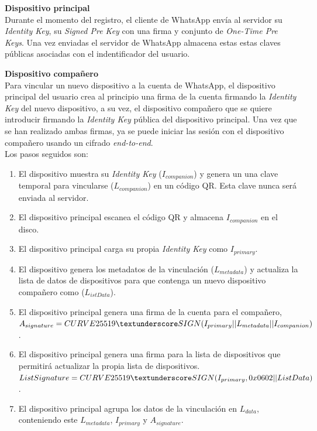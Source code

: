 \begin{description}
	\item \textbf{Dispositivo principal}\\
	Durante el momento del registro, el cliente de WhatsApp envía al servidor su \emph{Identity Key}, su \emph{Signed Pre Key} con una firma y conjunto de \emph{One-Time Pre Keys}. Una vez enviadas el servidor de WhatsApp almacena estas estas claves públicas asociadas con el indentificador del usuario.

	\item \textbf{Dispositivo compañero}\\
	Para vincular un nuevo dispositivo a la cuenta de WhatsApp, el dispositivo principal del usuario crea al principio una firma de la cuenta firmando la \emph{Identity Key} del nuevo dispositivo, a su vez, el dispositivo compañero que se quiere introducir firmando la \emph{Identity Key} pública del dispositivo principal. Una vez que se han realizado ambas firmas, ya se puede iniciar las sesión con el dispositivo compañero usando un cifrado \emph{end-to-end}.\\Los pasos seguidos son:
	\begin{enumerate}
		\item El dispositivo muestra su \emph{Identity Key} ($I_{companion}$) y genera un una clave temporal para vincularse ($L_{companion}$) en un código QR. Esta clave nunca será enviada al servidor.
		\item El dispositivo principal escanea el código QR y almacena $I_{companion}$ en el disco.
		\item El dispositivo principal carga su propia \emph{Identity Key} como $I_{primary}$.
		\item El dispositivo genera los metadatos de la vinculación ($L_{metadata}$) y actualiza la lista de datos de dispositivos para que contenga un nuevo dispositivo compañero como ($L_{istData}$).
		\item El dispositivo principal genera una firma de la cuenta para el compañero, $A_{signature}=CURVE25519\textunderscore SIGN(I_{primary} || L_{metadata} || I_{companion})$.
		\item El dispositivo principal genera una firma para la lista de dispositivos que permitirá actualizar la propia lista de dispositivos. $ListSignature = CURVE25519\textunderscore SIGN(I_{primary}, 0x0602 || ListData)$.
		\item El dispositivo principal agrupa los datos de la vinculación en $L_{data}$, conteniendo este $L_{metadata}$, $I_{primary}$ y $A_{signature}$.

\end{enumerate}
\end{description}
